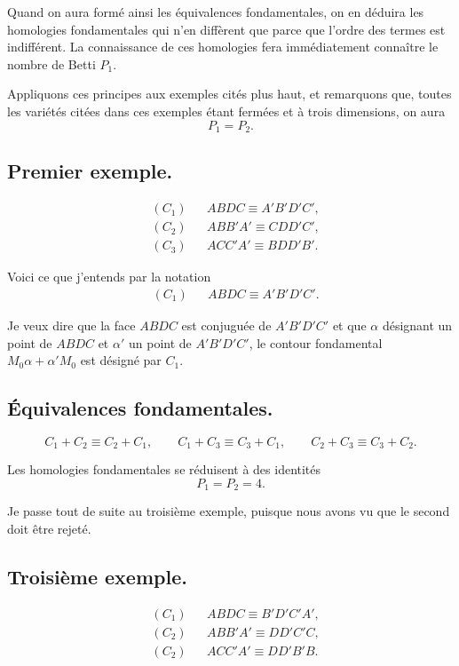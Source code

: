 \documentclass{article}
\begin{document}
Quand on aura formé ainsi les équivalences fondamentales, on en déduira les homologies fondamentales qui n'en diffèrent que parce que l'ordre des termes est indifférent. La connaissance de ces homologies fera immédiatement connaître le nombre de Betti $P_{1}$.

Appliquons ces principes aux exemples cités plus haut, et remarquons que, toutes les variétés citées dans ces exemples étant fermées et à trois dimensions, on aura
\[ P_{1} = P_{2}. \]

\subsection*{Premier exemple.}

\[ \begin{aligned} &(C_{1}) &&ABDC \equiv A'B'D'C',\\ &(C_{2}) &&ABB'A' \equiv CDD'C',\\ &(C_{3}) &&ACC'A' \equiv BDD'B'. \end{aligned} \]

Voici ce que j'entends par la notation
\[ \begin{aligned} &(C_{1}) &&ABDC \equiv A'B'D'C'. \end{aligned} \]

Je veux dire que la face $ABDC$ est conjuguée de $A'B'D'C'$ et que $\alpha$ désignant un point de $ABDC$ et $\alpha'$ un point de $A'B'D'C'$, le contour fondamental $M_{0}\alpha + \alpha'M_{0}$ est désigné par $C_{1}$.

\subsection*{Équivalences fondamentales.}

\[ C_{1} + C_{2} \equiv C_{2} + C_{1}, \qquad C_{1} + C_{3} \equiv C_{3} + C_{1}, \qquad C_{2} + C_{3} \equiv C_{3} + C_{2}. \]

Les homologies fondamentales se réduisent à des identités
\[ P_{1} = P_{2} = 4. \]

Je passe tout de suite au troisième exemple, puisque nous avons vu que le second doit être rejeté.

\subsection*{Troisième exemple.}

\[ \begin{aligned} &(C_{1}) &&ABDC \equiv B'D'C'A',\\ &(C_{2}) &&ABB'A' \equiv DD'C'C,\\ &(C_{2}) &&ACC'A' \equiv DD'B'B. \end{aligned} \]
\end{document}

